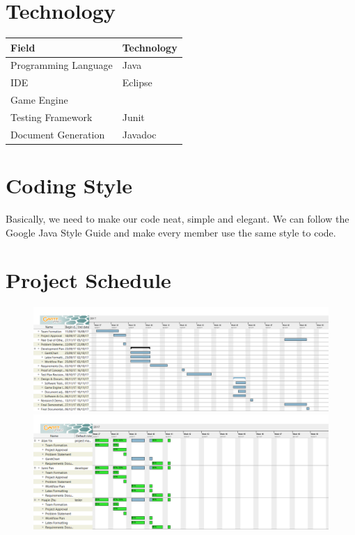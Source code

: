 \documentclass[12pt]{article}
\begin{document}
\section{Technology}
\begin{tabular}{ | m{12em} | m{6cm} | } 
\hline
Field & Technology \\
\hline
Programming Language & Java \\ 
\hline
IDE & Eclipse \\ 
\hline
Game Engine & \color{red}{Slick2D} \\ 
\hline
Testing Framework & Junit \\
\hline
Document Generation & Javadoc \\
\hline
\end{tabular}

\section{Coding Style}
Basically, we need to make our code neat, simple and elegant. We can follow the Google Java Style Guide and make every member use the same style to code.

\section{Project Schedule}
\begin{figure}
\centering
\includegraphics[width=16cm]{img/gantt1.png}
\includegraphics[width=16cm]{img/gantt2.png}
\end{figure}
\newpage
\end{document}
